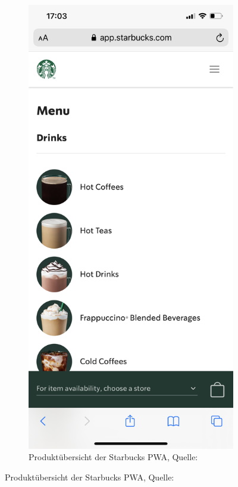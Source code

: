 \begin{figure}[h]
\begin{subfigure}[b]{0.4\textwidth}
		\label{img: Startseite der Starbucks PWA}
	\end{subfigure}
	\hfill
	\begin{subfigure}[b]{0.4\textwidth}
		\includegraphics[scale=0.15]{images/starbucks_angebot.PNG}
		\caption[Produktübersicht der Starbucks \gls{PWA}]{Produktübersicht der Starbucks \gls{PWA}, Quelle: \cite{starbucksPwaMenu}}
		\label{img: Produktübersicht der Starbucks PWA}
	\end{subfigure}
\end{figure}

